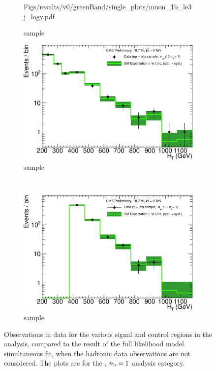 \begin{figure}[h!]
\begin{subfigure}[b]{0.48\textwidth}
    {Figs/results/v0/greenBand/single_plots/muon_1b_le3j_logy.pdf}
    \caption{\mj sample}
  \end{subfigure}
  \begin{subfigure}[b]{0.48\textwidth}
    \includegraphics[width=\textwidth]
    {Figs/results/v0/greenBand/single_plots/mumu_1b_le3j_logy.pdf}
    \caption{\mmj sample}
  \end{subfigure}\\
  \begin{subfigure}[b]{0.48\textwidth}
    \includegraphics[width=\textwidth]
    {Figs/results/v0/greenBand/single_plots/photon_1b_le3j_logy.pdf}
    \caption{\gj sample}
  \end{subfigure}
  \caption{Observations in data for the various signal and control
  regions in the analysis, compared to the result of the full likelihood model
  simultaneous fit, when the hadronic data observations are not considered. The
  plots are for the \njlow, $n_{\text{b}} = 1$ analysis category.}
  \label{fig:green_fits_1b_le3j}
\end{figure}

